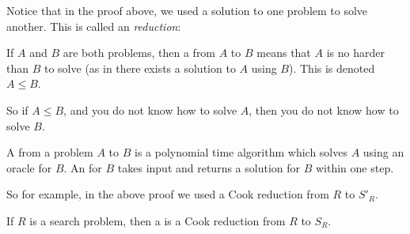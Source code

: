 \documentclass[10pt]{article}
\begin{document}
Notice that in the proof above, we used a solution to one problem to solve another.
This is called an \emph{reduction}:

\begin{defn*}

    If $A$ and $B$ are both problems, then a  from $A$ to $B$ means that $A$ is no harder than $B$ to solve (as in there exists a solution to $A$ using $B$).
    This is denoted $A\leq B$.

\end{defn*}

So if $A\leq B$, and you do not know how to solve $A$, then you do not know how to solve $B$.

\begin{defn*}

    A  from a problem $A$ to $B$ is a polynomial time algorithm which solves $A$ using an oracle for $B$.
    An  for $B$ takes input and returns a solution for $B$ within one step.

\end{defn*}

So for example, in the above proof we used a Cook reduction from $R$ to $S'_R$.

\begin{defn*}

    If $R$ is a search problem, then a  is a Cook reduction from $R$ to $S_R$.

\end{defn*}
\end{document}
